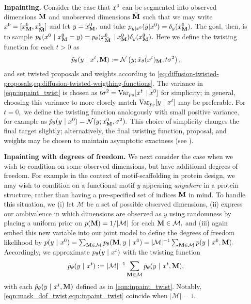 \textbf{Inpainting.}
Consider the case that $x^{0}$ can be segmented into observed dimensions $\mathbf{M}$ and unobserved dimensions $\mathbf{\bar M}$ such that we may write $x^{0}=[x^{0}_{\mathbf{M}}, x^{0}_{\mathbf{\bar M}}]$
and let $y=x^{0}_{\mathbf{M}},$
and take $p_{y|x^{0}}({y}|{x^{0}})=\delta_y(x^{0}_{\mathbf{M}}).$
The goal, then, is to sample
$p_{\theta}(x^{0} ~\vert~ x^{0}_{\mathbf{M}} =y)= p_{\theta}(x^{0}_{\mathbf{\bar M}} ~\vert~ x^{0}_{\mathbf{M}})\delta_{y}(x^{0}_{\mathbf{M}}).$
Here we define the twisting function for each $t>0$ as 
\begin{align}\label{eqn:inpaint_twist}
    \tilde p_\theta(y~\vert~ x^{t}, \mathbf{M}):= \mathcal{N}\left(y; {\hat x}_\theta (x^{t})_{\mathbf{M}}, t\sigma^2 \right),
\end{align}
and set twisted proposals and weights according to 
\cref{eq:diffusion-twisted-proposals,eq:diffusion-twisted-weigthing-functions}.
The variance in \cref{eqn:inpaint_twist}
is chosen as $t \sigma^2 =\mathrm{Var}_{p_{\theta}}[x^{t} ~\vert~ x^{0}]$ for simplicity;
in general, choosing this variance to more closely match $\mathrm{Var}_{p_{\theta}}[y~\vert~ x^{t}]$ may be preferable.
For $t=0,$ we define the twisting function analogously with small positive variance, 
for example as $\tilde p_\theta(y~\vert~ x^{0})= \mathcal{N}(y; x^{0}_{\mathbf{M}}, \sigma^2).$
This choice of simplicity changes the final target slightly;
alternatively, the final twisting function, proposal, and weights may be chosen to maintain asymptotic exactness (see ).



\textbf{Inpainting with degrees of freedom.} 
We next consider the case when we wish to condition on some observed dimensions,
but have additional degrees of freedom.
For example in the context of motif-scaffolding in protein design,
we may wish to condition on a functional motif $y$ appearing \emph{anywhere} in a protein structure, rather than having a pre-specified set of indices $\mathbf{M}$ in mind. 
To handle this situation, we
(i) let $\mathcal{M}$ be a set of possible observed dimensions,
(ii) express our ambivalence in which dimensions are observed as $y$ using randomness by placing a uniform prior on $p(\mathbf{M})= 1/|\mathcal{M}|$ for each $\mathbf{M} \in \mathcal{M},$ and
(iii) again embed this new variable into our joint model to define the degrees of freedom likelihood by 
$p(y~\vert~ x^{0})=\sum_{\mathbf{M} \in \mathcal{M}} p_{\theta}(\mathbf{M}, y ~\vert~ x^{0})=|\mathcal{M}|^{-1} \sum_{\mathbf{M} \in \mathcal{M}} p(y~\vert~ x^{0}, \mathbf{M}).$
Accordingly, we approximate $p_{\theta}(y~\vert~ x^{t})$ with the twisting function
\begin{align}\label{eqn:mask_dof_twist}
    \tilde p_\theta(y~\vert~ x^{t}) := |\mathcal{M}|^{-1} \sum_{\mathbf{M} \in \mathcal{M}} \tilde p_\theta(y~\vert~ x^{t}, \mathbf{M}),
\end{align}
with each $\tilde p_\theta(y~\vert~ x^{t},\mathbf{M})$ defined
as in \cref{eqn:inpaint_twist}.
Notably, \cref{eqn:mask_dof_twist,eqn:inpaint_twist} coincide when $|\mathcal{M}|=1.$

